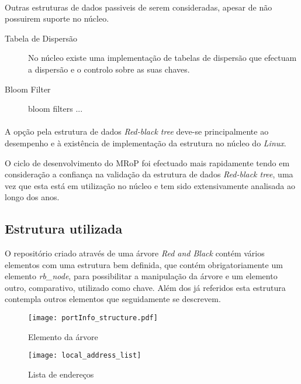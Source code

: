 \paragraph*{}
Outras estruturas de dados passiveis de serem consideradas, apesar de não possuirem suporte no núcleo.

\begin{description}
\item[Tabela de Dispersão]
No núcleo existe uma implementação de tabelas de dispersão que efectuam a dispersão e o controlo sobre as suas chaves.


\item[Bloom Filter]
bloom filters ...

\end{description}
\paragraph*{}
A opção pela estrutura de dados \textit{Red-black tree} deve-se principalmente ao desempenho e à existência de implementação da estrutura no núcleo do \textit{Linux}.

O ciclo de desenvolvimento do MRoP foi efectuado mais rapidamente tendo em consideração a confiança na validação da estrutura de dados \textit{Red-black tree}, uma vez que esta está em utilização no núcleo e tem sido extensivamente analisada ao longo dos anos.
 
\subsection{Estrutura utilizada}
\label{sub:repo_structure}

O repositório criado através de uma árvore \textit{Red and Black} contém vários elementos com uma estrutura bem definida, que contém obrigatoriamente um elemento \textit{rb\_node}, para possibilitar a manipulação da árvore e um elemento outro, comparativo, utilizado como chave.
Além dos já referidos esta estrutura contempla outros elementos que seguidamente se descrevem.

\begin{figure}[ht]
\begin{minipage}[b]{0.5\linewidth}
\centering
\texttt{[image: portInfo\_structure.pdf]}
\caption{Elemento da árvore}
\label{fig:portInfo}
\end{minipage}
\hspace{0.5cm}
\begin{minipage}[b]{0.5\linewidth}
\centering
\texttt{[image: local\_address\_list]}
\caption{Lista de endereços}
\label{fig:local_address_list}
\end{minipage}
\end{figure}


